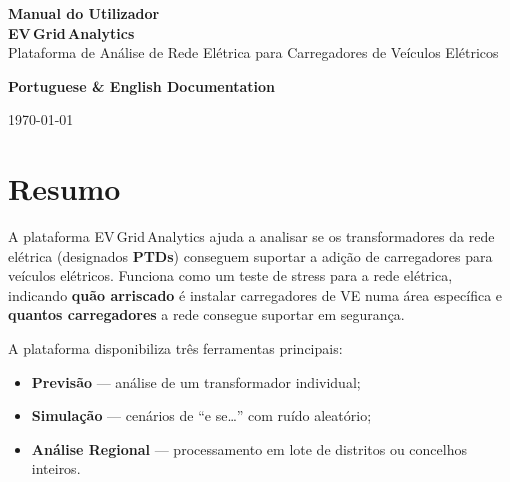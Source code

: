 \documentclass[11pt,a4paper,openany]{book}
\newcommand{\EVGrid}{\textsf{EV\,Grid\,Analytics}}
\newcommand{\ptd}{PTD}
\begin{document}
\begin{titlepage}
\begin{center}
\vspace*{2cm}
{\Huge\bfseries\sffamily\color{accent} Manual do Utilizador}\\[0.8cm]
{\LARGE\bfseries\sffamily\color{darkgray} \EVGrid}\\[0.4cm]
{\large\sffamily\color{muted} Plataforma de Análise de Rede Elétrica para Carregadores de Veículos Elétricos}\\[2cm]
\vfill
\begin{tcolorbox}[
  colback=lightgray, colframe=accent, arc=4pt, boxrule=1pt,
  width=0.85\textwidth, halign=center
]
\large\sffamily
\textbf{Portuguese \& English Documentation}
\end{tcolorbox}
\vspace{2cm}
{\large\sffamily\today}
\vfill
\end{center}
\end{titlepage}

\frontmatter

\chapter*{Resumo}

A plataforma \EVGrid{} ajuda a analisar se os transformadores da rede elétrica (designados \textbf{\ptd s}) conseguem suportar a adição de carregadores para veículos elétricos. Funciona como um teste de stress para a rede elétrica, indicando \textbf{quão arriscado} é instalar carregadores de VE numa área específica e \textbf{quantos carregadores} a rede consegue suportar em segurança.

A plataforma disponibiliza três ferramentas principais:
\begin{itemize}
\item \textbf{Previsão} --- análise de um transformador individual;
\item \textbf{Simulação} --- cenários de ``e se\ldots'' com ruído aleatório;
\item \textbf{Análise Regional} --- processamento em lote de distritos ou concelhos inteiros.
\end{itemize}
\end{document}
